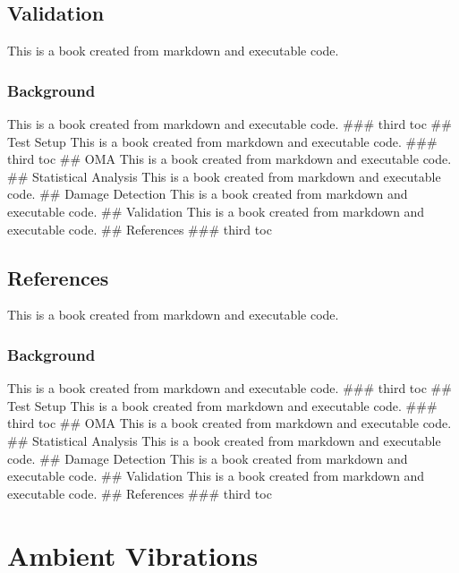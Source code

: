\documentclass[
  letterpaper,
  DIV=11,
  numbers=noendperiod]{scrreprt}
\begin{document}
\hypertarget{validation}{%
\chapter{Validation}\label{validation}}

This is a book created from markdown and executable code.

\hypertarget{background-13}{%
\section{Background}\label{background-13}}

This is a book created from markdown and executable code. \#\#\# third
toc \#\# Test Setup This is a book created from markdown and executable
code. \#\#\# third toc \#\# OMA This is a book created from markdown and
executable code. \#\# Statistical Analysis This is a book created from
markdown and executable code. \#\# Damage Detection This is a book
created from markdown and executable code. \#\# Validation This is a
book created from markdown and executable code. \#\# References \#\#\#
third toc

\hypertarget{references-1}{%
\chapter{References}\label{references-1}}

This is a book created from markdown and executable code.

\hypertarget{background-14}{%
\section{Background}\label{background-14}}

This is a book created from markdown and executable code. \#\#\# third
toc \#\# Test Setup This is a book created from markdown and executable
code. \#\#\# third toc \#\# OMA This is a book created from markdown and
executable code. \#\# Statistical Analysis This is a book created from
markdown and executable code. \#\# Damage Detection This is a book
created from markdown and executable code. \#\# Validation This is a
book created from markdown and executable code. \#\# References \#\#\#
third toc

\part{Ambient Vibrations}
\end{document}
